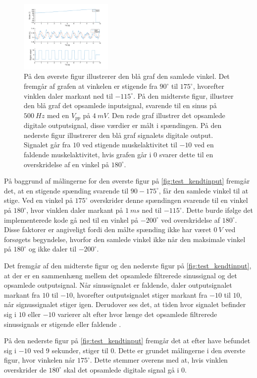 \begin{figure}[H]
\centering
\includegraphics[width=0.4\textwidth]{figures/kontrol_test_sinus}
\caption{På den øverste figur illustrerer den blå graf den samlede vinkel. Det fremgår af grafen at vinkelen er stigende fra $90^{\circ}$ til $175^{\circ}$, hvorefter vinklen daler markant ned til $-115^{\circ}$. 
På den midterste figur, illustrer den blå graf det opsamlede inputsignal, svarende til en sinus på $500~Hz$ med en $V_{pp}$ på $4~mV$. Den røde graf illustrer det opsamlede digitale outputsignal, disse værdier er målt i spændingen. 
På den nederste figur illustrerer den blå graf signalets digitale output. Signalet går fra $10$ ved stigende muskelaktivitet til $-10$ ved en faldende muskelaktivitet, hvis grafen går i $0$ svarer dette til en overskridelse af en vinkel på $180^{\circ}$.}
\label{fig:test_kendtinput}
\end{figure}

På baggrund af målingerne for den øverste figur på \autoref{fig:test_kendtinput} fremgår det, at en stigende spænding svarende til $90-175^{\circ}$, får den samlede vinkel til at stige. Ved en vinkel på $175^{\circ}$ overskrider denne spændingen svarende til en vinkel på $180^{\circ}$, hvor vinklen daler markant på $1~ms$ ned til $-115^{\circ}$. 
Dette burde ifølge det implementerede kode gå ned til en vinkel på $-200^{\circ}$ ved overskridelse af $180^{\circ}$.
Disse faktorer er angiveligt fordi den målte spænding ikke har været $0~V$ ved forsøgets begyndelse, hvorfor den samlede vinkel ikke når den maksimale vinkel på $180^{\circ}$ og ikke daler til $-200^{\circ}$.

Det fremgår af den midterste figur og den nederste figur på \autoref{fig:test_kendtinput}, at der er en sammenhæng mellem det opsamlede filtrerede sinussignal og det opsamlede outputsignal. Når sinussignalet er faldende, daler outputsignalet markant fra $10$ til $-10$, hvorefter outputsignalet stiger markant fra $-10$ til $10$, når signussignalet stiger igen. Derudover ses det, at tiden hvor signalet befinder sig i $10$ eller $-10$ varierer alt efter hvor længe det opsamlede filtrerede sinussignals er stigende eller faldende .

På den nederste figur på \autoref{fig:test_kendtinput} fremgår det at efter have befundet sig i $-10$ ved 9 sekunder, stiger til $0$. Dette er grundet målingerne i den øverste figur, hvor vinkelen når $175^{\circ}$. Dette stemmer overens med at, hvis vinklen  overskrider de $180^{\circ}$ skal det opsamlede digitale signal gå i $0$. 